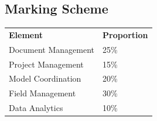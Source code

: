 \subsection*{Marking Scheme}

\begin{table}[h!]
	\begin{center}
		\begin{tabular}{p{5cm}  p{5cm} }
			\toprule
			\textbf{Element} & \textbf{Proportion} \\ 
			\cmidrule(r){1-1}\cmidrule(lr){2-2}
			Document Management & 25\%\\
			Project Management & 15\%\\
			Model Coordination & 20\%\\
			Field Management & 30\%\\
			Data Analytics & 10\%\\
			\bottomrule
		\end{tabular}
		\label{tbl:markSchemeAsmt2}
	\end{center}
\end{table}

